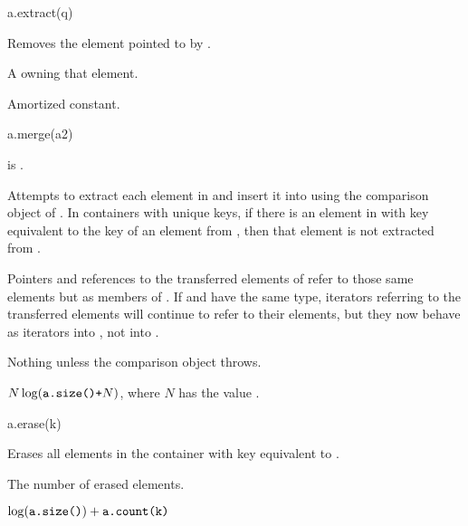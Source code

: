 %
\begin{itemdecl}
a.extract(q)
\end{itemdecl}

\begin{itemdescr}
\pnum
\result
{}

\pnum
\effects
Removes the element pointed to by .

\pnum
\returns
A  owning that element.

\pnum
\complexity
Amortized constant.
\end{itemdescr}

%
\begin{itemdecl}
a.merge(a2)
\end{itemdecl}

\begin{itemdescr}
\pnum
\result
{}

\pnum
\expects
{} is .

\pnum
\effects
Attempts to extract each element in  and insert it into 
using the comparison object of .
In containers with unique keys,
if there is an element in  with key equivalent to
the key of an element from ,
then that element is not extracted from .

\pnum
\ensures
Pointers and references to the transferred elements of 
refer to those same elements but as members of .
If  and  have the same type,
iterators referring to the transferred elements
will continue to refer to their elements,
but they now behave as iterators into , not into .

\pnum
\throws
Nothing unless the comparison object throws.

\pnum
\complexity
$N \log(\texttt{\protect a.size()+} N)$, where $N$ has the value .
\end{itemdescr}

%
\begin{itemdecl}
a.erase(k)
\end{itemdecl}

\begin{itemdescr}
\pnum
\result
{}

\pnum
\effects
Erases all elements in the container with key equivalent to .

\pnum
\returns
The number of erased elements.

\pnum
\complexity
$\log (\texttt{\protect a.size()}) + \texttt{\protect a.count(k)}$
\end{itemdescr}

